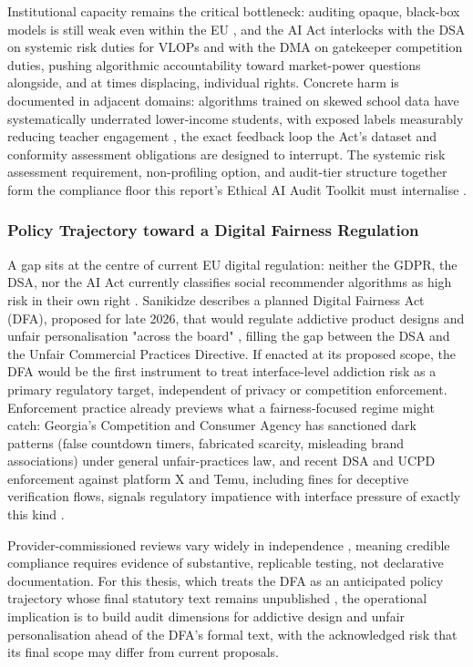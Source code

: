 \documentclass[11pt]{article}
\begin{document}
Institutional capacity remains the critical bottleneck: auditing opaque, black-box models is still weak even within the EU \parencites[9]{7461574}[2]{1456534}, and the AI Act interlocks with the DSA on systemic risk duties for VLOPs and with the DMA on gatekeeper competition duties, pushing algorithmic accountability toward market-power questions alongside, and at times displacing, individual rights. Concrete harm is documented in adjacent domains: algorithms trained on skewed school data have systematically underrated lower-income students, with exposed labels measurably reducing teacher engagement \parencites[2]{6362702}, the exact feedback loop the Act's dataset and conformity assessment obligations are designed to interrupt. The systemic risk assessment requirement, non-profiling option, and audit-tier structure together form the compliance floor this report's Ethical AI Audit Toolkit must internalise \parencites[12]{6502223}[2]{1456534}.

\subsubsection{Policy Trajectory toward a Digital Fairness Regulation}
\label{sec:policy_trajectory_digital_fairness} A gap sits at the centre of current EU digital regulation: neither the GDPR, the DSA, nor the AI Act currently classifies social recommender algorithms as high risk in their own right \parencites[2248]{6502223}[8]{1456534}. Sanikidze describes a planned Digital Fairness Act (DFA), proposed for late 2026, that would regulate addictive product designs and unfair personalisation "across the board" \parencites[390]{7896734}, filling the gap between the DSA and the Unfair Commercial Practices Directive. If enacted at its proposed scope, the DFA would be the first instrument to treat interface-level addiction risk as a primary regulatory target, independent of privacy or competition enforcement. Enforcement practice already previews what a fairness-focused regime might catch: Georgia's Competition and Consumer Agency has sanctioned dark patterns (false countdown timers, fabricated scarcity, misleading brand associations) under general unfair-practices law, and recent DSA and UCPD enforcement against platform X and Temu, including fines for deceptive verification flows, signals regulatory impatience with interface pressure of exactly this kind \parencites[390]{7896734}.

Provider-commissioned reviews vary widely in independence \parencites[13]{2574631}, meaning credible compliance requires evidence of substantive, replicable testing, not declarative documentation. For this thesis, which treats the DFA as an anticipated policy trajectory whose final statutory text remains unpublished \parencites[2248]{6502223}[390]{7896734}, the operational implication is to build audit dimensions for addictive design and unfair personalisation ahead of the DFA's formal text, with the acknowledged risk that its final scope may differ from current proposals.
\end{document}
